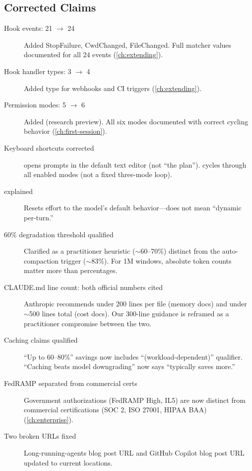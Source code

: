 \subsection*{Corrected Claims}

\begin{description}
  \item[Hook events: 21 $\rightarrow$ 24]
    Added StopFailure, CwdChanged, FileChanged. Full matcher values documented
    for all 24 events (\cref{ch:extending}).

  \item[Hook handler types: 3 $\rightarrow$ 4]
    Added  type for webhooks and CI triggers (\cref{ch:extending}).

  \item[Permission modes: 5 $\rightarrow$ 6]
    Added  (research preview). All six modes documented with
    correct  cycling behavior (\cref{ch:first-session}).

  \item[Keyboard shortcuts corrected]
     opens prompts in the default text editor (not ``the plan'').
     cycles through all enabled modes (not a fixed three-mode loop).

  \item[ explained]
    Resets effort to the model's default behavior---does not mean ``dynamic per-turn.''

  \item[60\% degradation threshold qualified]
    Clarified as a practitioner heuristic ($\sim$60--70\%) distinct from the
    auto-compaction trigger ($\sim$83\%). For 1M windows, absolute token counts
    matter more than percentages.

  \item[CLAUDE.md line count: both official numbers cited]
    Anthropic recommends under 200 lines per file (memory docs) and under
    $\sim$500 lines total (cost docs). Our 300-line guidance is reframed as a
    practitioner compromise between the two.

  \item[Caching claims qualified]
    ``Up to 60--80\%'' savings now includes ``(workload-dependent)'' qualifier.
    ``Caching beats model downgrading'' now says ``typically saves more.''

  \item[FedRAMP separated from commercial certs]
    Government authorizations (FedRAMP High, IL5) are now distinct from
    commercial certifications (SOC 2, ISO 27001, HIPAA BAA) (\cref{ch:enterprise}).

  \item[Two broken URLs fixed]
    Long-running-agents blog post URL and GitHub Copilot blog post URL
    updated to current locations.
\end{description}


